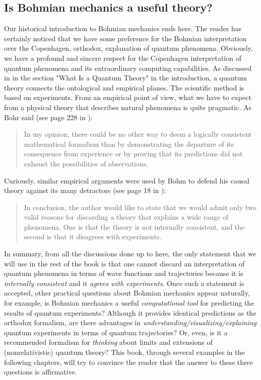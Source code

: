 \documentclass[nofootinbib, secnumarabic, amsmath, nobibnotes,10pt,aps,pra]{revtex4-1}
\begin{document}
\vspace*{-6pt}
\subsection{Is Bohmian mechanics a useful theory?}\label{om.sec_intro.10}

Our historical introduction to Bohmian mechanics ends here. The
reader has certainly noticed that we have some preference for the
Bohmian interpretation over the Copenhagen, orthodox, explanation of
quantum phenomena. Obviously, we have a profound and
sincere respect for the Copenhagen interpretation of quantum
phenomena and its extraordinary computing capabilities. As discussed in in the section "What Is a Quantum Theory" in the introduction, a quantum theory connects the ontological and empirical planes. The scientific method is based on experiments. From an empirical point of view, 
what we have to expect from a physical theory that describes
natural phenomena is quite pragmatic. As Bohr said (see page 228 in
\cite{om.bohr1949}):\\
\begin{quote}
In my opinion, there could be no other way to deem a logically consistent mathematical formalism than by demonstrating the departure of its consequence from experience or by proving that its predictions did not exhaust the possibilities of observations.\\
\end{quote}
Curiously, similar empirical arguments were used by Bohm to defend his causal theory against its many detractors (see page 18 in \cite{om.Bohm1953b}):\\
\begin{quote}
In conclusion, the author would like to state that we would admit only two valid reasons for discarding a theory that explains a wide range of phenomena. One is that the theory is not internally consistent, and the second is that it disagrees with experiments.\\
\end{quote}\vspace*{-12pt}
In summary, from all the discussions done up to here, the only
statement that we will use in the rest of the book is that one
cannot discard an interpretation of quantum phenomena in terms of
wave functions and trajectories because it is \textit{internally consistent}
and it \textit{agrees with experiments}. Once such a statement is
accepted, other practical questions about Bohmian mechanics appear
naturally, for example, is Bohmian mechanics a useful
\textit{computational tool} for predicting the results of quantum experiments?
Although it provides identical predictions as the orthodox
formalism, are there advantages in
\textit{understanding/visualizing/explaining} quantum experiments in
terms of quantum trajectories? Or, even, is it a recommended
formalism for \textit{thinking} about limits and extensions of
(nonrelativistic) quantum theory? This book, through several
examples in the following chapters, will try to convince the reader
that the answer to these three questions is affirmative.
\end{document}
